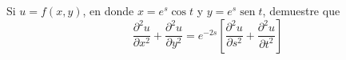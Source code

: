 \item Si $u = f(x, y)$, en donde $x = e^s \cos t$ y $y = e^s \operatorname{sen} t$, demuestre que
\[ \frac{\partial^2 u}{\partial x^2} + \frac{\partial^2 u}{\partial y^2} = e^{-2s} \left[ \frac{\partial^2 u}{\partial s^2} + \frac{\partial^2 u}{\partial t^2} \right] \]
